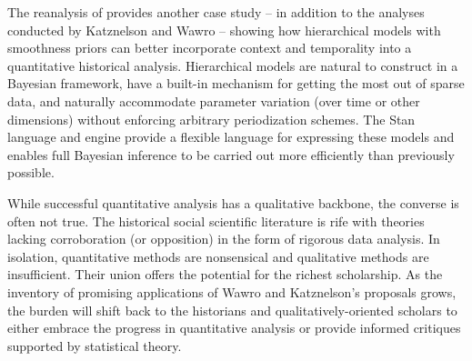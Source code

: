 The reanalysis of 
provides another case study -- in addition to the analyses conducted by Katznelson and 
Wawro -- showing how hierarchical models with smoothness priors can better incorporate 
context and temporality into a quantitative historical analysis. Hierarchical models are 
natural to construct in a Bayesian framework, have a built-in mechanism for getting the most
out of sparse data, and naturally accommodate parameter variation (over time or other dimensions) 
without enforcing arbitrary periodization schemes. The Stan language and engine provide 
a flexible language for expressing these models and enables full Bayesian inference to be carried 
out more efficiently than previously possible.  

While successful quantitative analysis has a qualitative backbone, 
the converse is often not true. The historical social scientific literature 
is rife with theories lacking corroboration (or opposition) in the form of rigorous 
data analysis. In isolation, quantitative methods are nonsensical and
qualitative methods are insufficient. Their union offers the potential for the richest 
scholarship.  As the inventory of promising applications of Wawro and 
Katznelson's proposals grows, the burden will shift back to the historians and 
qualitatively-oriented scholars to either embrace the progress in quantitative analysis 
or provide informed critiques supported by statistical theory. 

